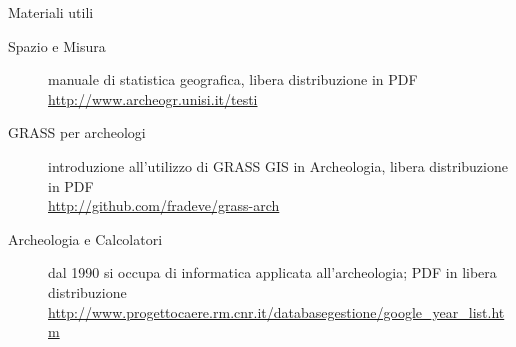 \documentclass{beamer}
\begin{document}
        \begin{frame}{Materiali utili}
            \begin{description}
                \item[Spazio e Misura]manuale di statistica geografica, libera distribuzione in PDF\\\url{http://www.archeogr.unisi.it/testi}
                \item[GRASS per archeologi]introduzione all'utilizzo di GRASS GIS in Archeologia, libera distribuzione in PDF\\\url{http://github.com/fradeve/grass-arch}
                \item[Archeologia e Calcolatori]dal 1990 si occupa di informatica applicata all'archeologia; PDF in libera distribuzione\\\url{http://www.progettocaere.rm.cnr.it/databasegestione/google_year_list.htm}
            \end{description}
        \end{frame}
\end{document}
